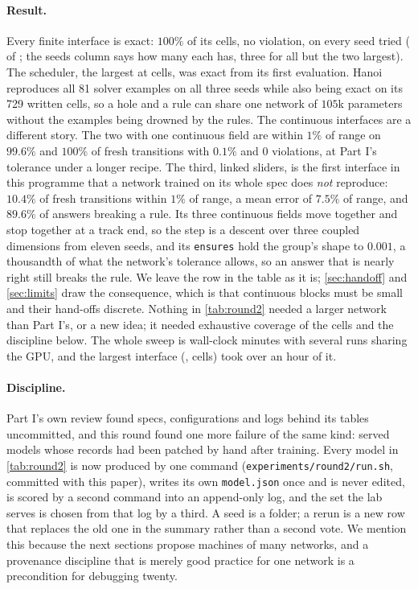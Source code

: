 \paragraph{Result.} Every finite interface is exact: $100\%$ of its cells, no violation, on every seed tried
(\nExactSpecs{} of \nFiniteSpecs{}; the seeds column says how many each has, three for all but the two
largest). The scheduler, the largest at \maxCells{} cells, was exact from its first evaluation. Hanoi reproduces all 81 solver examples on all three seeds while also being exact on its 729
written cells, so a hole and a rule can share one network of $105$k parameters without the examples being
drowned by the rules. The continuous interfaces are a different story. The two with one continuous field are
within $1\%$ of range on $99.6\%$ and $100\%$ of fresh transitions with $0.1\%$ and $0$ violations, at Part I's
tolerance under a longer recipe. The third, linked sliders, is the first interface in this programme that a
network trained on its whole spec does \emph{not} reproduce: $10.4\%$ of fresh transitions within $1\%$ of
range, a mean error of $7.5\%$ of range, and $89.6\%$ of answers breaking a rule. Its three continuous fields
move together and stop together at a track end, so the step is a descent over three coupled dimensions from
eleven seeds, and its \texttt{ensures} hold the group's shape to $0.001$, a thousandth of what the network's
tolerance allows, so an answer that is nearly right still breaks the rule. We leave the row in the table as it
is; \cref{sec:handoff} and \cref{sec:limits} draw the consequence, which is that continuous blocks must be
small and their hand-offs discrete. Nothing in \cref{tab:round2} needed a larger network than Part
I's, or a new idea; it needed exhaustive coverage of the cells and the discipline below. The whole sweep is
\totalGpuMinutes{} wall-clock minutes with several runs sharing the GPU, and the largest interface
(\maxCellsSpec, \maxCells{} cells) took over an hour of it.

\paragraph{Discipline.} Part I's own review found specs, configurations and logs behind its tables
uncommitted, and this round found one more failure of the same kind: served models whose records had been
patched by hand after training. Every model in \cref{tab:round2} is now produced by one command
(\texttt{experiments/round2/run.sh}, committed with this paper), writes its own \texttt{model.json} once and
is never edited, is scored by a second command into an append-only log, and the set the lab serves is chosen
from that log by a third. A seed is a folder; a rerun is a new row that replaces the old one in the summary
rather than a second vote. We mention this because the next sections propose machines of many networks, and a provenance discipline
that is merely good practice for one network is a precondition for debugging twenty.

